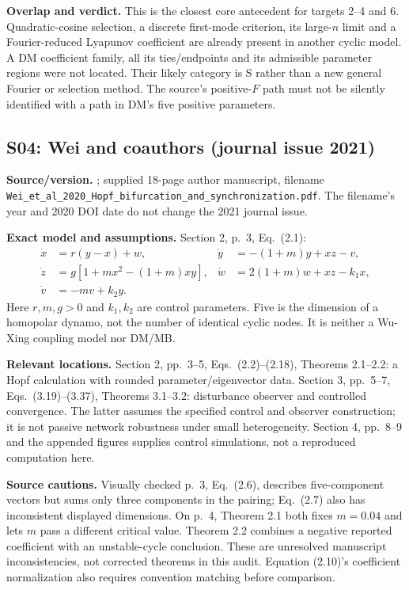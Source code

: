 \textbf{Overlap and verdict.} This is the closest core antecedent for
targets 2--4 and 6. Quadratic-cosine selection, a discrete first-mode
criterion, its large-$n$ limit and a Fourier-reduced Lyapunov coefficient
are already present in another cyclic model. A DM coefficient family,
all its ties/endpoints and its admissible parameter regions were not
located. Their likely category is S rather than a new general Fourier
or selection method. The source's positive-$F$ path must not be silently
identified with a path in DM's five positive parameters.

\subsection{S04: Wei and coauthors (journal issue 2021)}
\label{src:wei}
\textbf{Source/version.} \cite{WeiEtAl2021}; supplied 18-page author
manuscript, filename
\nolinkurl{Wei_et_al_2020_Hopf_bifurcation_and_synchronization.pdf}.
The filename's year and 2020 DOI date do not change the 2021 journal issue.

\textbf{Exact model and assumptions.} Section 2, p.~3, Eq.~(2.1):
\[
\begin{aligned}
 \dot x&=r(y-x)+w,& \dot y&=-(1+m)y+xz-v,\\
 \dot z&=g[1+mx^2-(1+m)xy],&
 \dot w&=2(1+m)w+xz-k_1x,\\
 \dot v&=-mv+k_2y.
\end{aligned}
\]
Here $r,m,g>0$ and $k_1,k_2$ are control parameters. Five is the
dimension of a homopolar dynamo, not the number of identical cyclic
nodes. It is neither a Wu-Xing coupling model nor DM/MB.

\textbf{Relevant locations.} Section 2, pp.~3--5, Eqs.~(2.2)--(2.18),
Theorems 2.1--2.2: a Hopf calculation with rounded parameter/eigenvector
data. Section 3, pp.~5--7, Eqs.~(3.19)--(3.37), Theorems 3.1--3.2:
disturbance observer and controlled convergence. The latter assumes the
specified control and observer construction; it is not passive network
robustness under small heterogeneity. Section 4, pp.~8--9 and the appended
figures supplies control simulations, not a reproduced computation here.

\textbf{Source cautions.} Visually checked p.~3, Eq.~(2.6), describes
five-component vectors but sums only three components in the pairing;
Eq.~(2.7) also has inconsistent displayed dimensions. On p.~4,
Theorem 2.1 both fixes $m=0.04$ and lets $m$ pass a different critical
value. Theorem 2.2 combines a negative reported coefficient with an
unstable-cycle conclusion. These are unresolved manuscript inconsistencies,
not corrected theorems in this audit. Equation (2.10)'s coefficient
normalization also requires convention matching before comparison.

